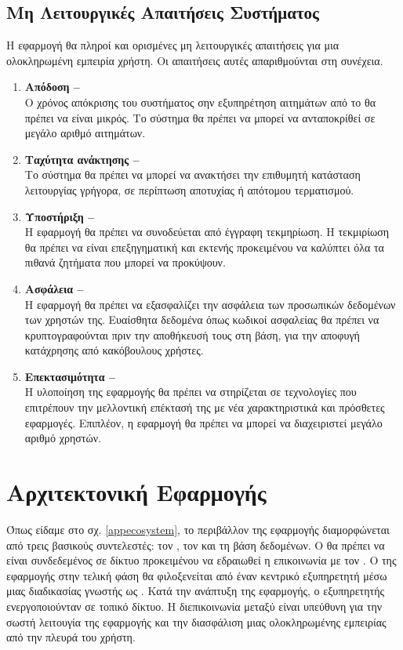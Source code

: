 \subsection{Μη Λειτουργικές Απαιτήσεις Συστήματος}
Η εφαρμογή θα πληροί και ορισμένες μη λειτουργικές απαιτήσεις για μια ολοκληρωμένη εμπειρία χρήστη. Οι απαιτήσεις αυτές απαριθμούνται στη συνέχεια.

\begin{enumerate}
    \item \textbf{Απόδοση -- } \\
    Ο χρόνος απόκρισης του συστήματος σην εξυπηρέτηση αιτημάτων από το  θα πρέπει να είναι μικρός. Το σύστημα θα πρέπει να μπορεί να ανταποκρίθεί σε μεγάλο αριθμό αιτημάτων.
    \item \textbf{Ταχύτητα ανάκτησης -- } \\
    Το σύστημα θα πρέπει να μπορεί να ανακτήσει την επιθυμητή κατάσταση λειτουργίας γρήγορα, σε περίπτωση αποτυχίας ή απότομου τερματισμού.
    \item \textbf{Υποστήριξη -- } \\
    Η εφαρμογή θα πρέπει να συνοδεύεται από έγγραφη τεκμηρίωση. Η τεκμιρίωση θα πρέπει να είναι επεξηγηματική και εκτενής προκειμένου να καλύπτει όλα τα πιθανά ζητήματα που μπορεί να προκύψουν.
    \item \textbf{Ασφάλεια -- } \\
    Η εφαρμογή θα πρέπει να εξασφαλίζει την ασφάλεια των προσωπικών δεδομένων των χρηστών της. Ευαίσθητα δεδομένα όπως κωδικοί ασφαλείας θα πρέπει να κρυπτογραφούνται πριν την αποθήκευσή τους στη βάση, για την αποφυγή κατάχρησης από κακόβουλους χρήστες.
    \item \textbf{Επεκτασιμότητα -- } \\
    Η υλοποίηση της εφαρμογής θα πρέπει να στηρίζεται σε τεχνολογίες που επιτρέπουν την μελλοντική επέκτασή της με νέα χαρακτηριστικά και πρόσθετες εφαρμογές. Επιπλέον, η εφαρμογή θα πρέπει να μπορεί να διαχειριστεί μεγάλο αριθμό χρηστών.
\end{enumerate}



\section{Αρχιτεκτονική Εφαρμογής}
Όπως είδαμε στο  σχ. \ref{appecosystem}, το περιβάλλον της εφαρμογής διαμορφώνεται από τρεις βασικούς συντελεστές: τον , τον  και τη βάση δεδομένων. Ο  θα πρέπει να είναι συνδεδεμένος σε δίκτυο προκειμένου να εδραιωθεί η επικοινωνία με τον . Ο  της εφαρμογής στην τελική φάση θα φιλοξενείται από έναν κεντρικό εξυπηρετητή μέσω μιας διαδικασίας γνωστής ως . Κατά την ανάπτυξη της εφαρμογής, ο εξυπηρετητής ενεργοποιούνταν σε τοπικό δίκτυο. Η διεπικοινωνία μεταξύ  είναι υπεύθυνη για την σωστή λειτουγία της εφαρμογής και την διασφάλιση μιας ολοκληρωμένης εμπειρίας από την πλευρά του χρήστη. 


